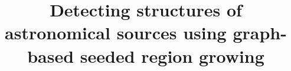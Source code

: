 \documentclass{aastex61}
\begin{document}
\title{Detecting structures of astronomical sources using graph-based seeded region growing}


\end{document}
